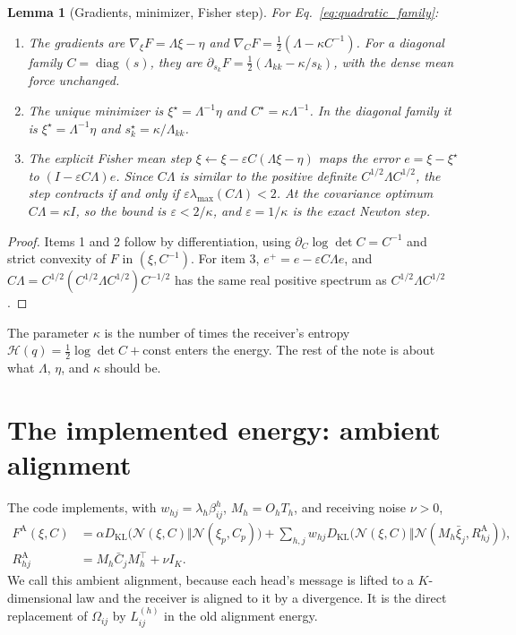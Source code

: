 \documentclass[11pt]{article}
\newtheorem{lemma}[proposition]{Lemma}
\theoremstyle{definition}
\theoremstyle{remark}
\newcommand{\KL}{D_{\mathrm{KL}}}
\newcommand{\diag}{\operatorname{diag}}
\newcommand{\N}{\mathcal{N}}
\newcommand{\Hent}{\mathcal{H}}
\begin{document}
\begin{lemma}[Gradients, minimizer, Fisher step]
\label{lem:family}
For Eq.~\eqref{eq:quadratic_family}:
\begin{enumerate}
\item The gradients are $\nabla_\xi F=\Lambda\xi-\eta$ and $\nabla_CF=\tfrac12(\Lambda-\kappa C^{-1})$. For a diagonal family $C=\diag(s)$, they are $\partial_{s_k}F=\tfrac12(\Lambda_{kk}-\kappa/s_k)$, with the dense mean force unchanged.
\item The unique minimizer is $\xi^\star=\Lambda^{-1}\eta$ and $C^\star=\kappa\Lambda^{-1}$. In the diagonal family it is $\xi^\star=\Lambda^{-1}\eta$ and $s_k^\star=\kappa/\Lambda_{kk}$.
\item The explicit Fisher mean step $\xi\leftarrow\xi-\varepsilon C(\Lambda\xi-\eta)$ maps the error $e=\xi-\xi^\star$ to $(I-\varepsilon C\Lambda)e$. Since $C\Lambda$ is similar to the positive definite $C^{1/2}\Lambda C^{1/2}$, the step contracts if and only if $\varepsilon\lambda_{\max}(C\Lambda)<2$. At the covariance optimum $C\Lambda=\kappa I$, so the bound is $\varepsilon<2/\kappa$, and $\varepsilon=1/\kappa$ is the exact Newton step.
\end{enumerate}
\end{lemma}

\begin{proof}
Items 1 and 2 follow by differentiation, using $\partial_C\log\det C=C^{-1}$ and strict convexity of $F$ in $(\xi,C^{-1})$. For item 3, $e^+=e-\varepsilon C\Lambda e$, and $C\Lambda=C^{1/2}(C^{1/2}\Lambda C^{1/2})C^{-1/2}$ has the same real positive spectrum as $C^{1/2}\Lambda C^{1/2}$.
\end{proof}

The parameter $\kappa$ is the number of times the receiver's entropy $\Hent(q)=\tfrac12\log\det C+\text{const}$ enters the energy. The rest of the note is about what $\Lambda$, $\eta$, and $\kappa$ should be.

\section{The implemented energy: ambient alignment}
\label{sec:ambient}

The code implements, with $w_{hj}=\lambda_h\beta_{ij}^h$, $M_h=O_hT_h$, and receiving noise $\nu>0$,
\begin{equation}
\begin{split}
F^{\mathrm A}(\xi,C)&=\alpha\KL\bigl(\N(\xi,C)\Vert\N(\xi_p,C_p)\bigr)
+\sum_{h,j}w_{hj}\KL\bigl(\N(\xi,C)\Vert\N(M_h\bar\xi_j,R^{\mathrm A}_{hj})\bigr),\\
R^{\mathrm A}_{hj}&=M_h\bar C_jM_h^\top+\nu I_K.
\end{split}
\label{eq:ambient}
\end{equation}
We call this ambient alignment, because each head's message is lifted to a $K$-dimensional law and the receiver is aligned to it by a divergence. It is the direct replacement of $\Omega_{ij}$ by $L_{ij}^{(h)}$ in the old alignment energy.
\end{document}
